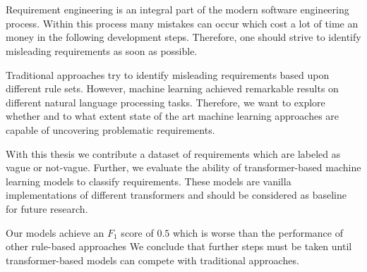 \chapter{\abstractname}

Requirement engineering is an integral part of the modern software engineering process.
Within this process many mistakes can occur which cost a lot of time an money in the following development steps.
Therefore, one should strive to identify misleading requirements as soon as possible.

Traditional approaches try to identify misleading requirements based upon different rule sets.
However, machine learning achieved remarkable results on different natural language processing tasks.
Therefore, we want to explore whether and to what extent state of the art machine learning approaches are capable of uncovering problematic requirements.

With this thesis we contribute a dataset of requirements which are labeled as vague or not-vague.
Further, we evaluate the ability of transformer-based machine learning models to classify requirements.
These models are vanilla implementations of different transformers and should be considered as baseline for future research.

Our models achieve an $F_1$ score of $0.5$ which is worse than the performance of other rule-based approaches
We conclude that further steps must be taken until transformer-based models can compete with traditional approaches.
